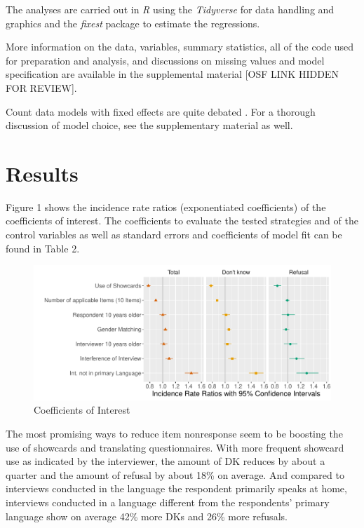 \documentclass[a4paper,12pt]{article}
\begin{document}
The analyses are carried out in \textit{R} \citep{rcoreteamLanguageEnvironmentStatistical2023} using the \textit{Tidyverse} \citep{wickhamWelcomeTidyverse2019} for data handling and graphics and the \textit{fixest} package \citep{bergeEfficientEstimationMaximum2018} to estimate the regressions.

More information on the data, variables, summary statistics, all of the code used for preparation and analysis, and discussions on missing values and model specification are available in the  %
{supplemental material} [OSF LINK HIDDEN FOR REVIEW].

Count data models with fixed effects are quite debated \citep{wooldridgeDistributionfreeEstimationNonlinear1999, allisonFixedEffectsNegativeBinomial2002, cameronRegressionAnalysisCount2013}. For a thorough discussion of model choice, see the supplementary material as well.

\section{Results}

Figure 1 shows the incidence rate ratios (exponentiated coefficients) of the coefficients of interest. The coefficients to evaluate the tested strategies and of the control variables as well as standard errors and coefficients of model fit can be found in Table 2.

\begin{figure}
\centering
\caption{Coefficients of Interest}
\includegraphics[width=\linewidth]{results_inr_ess9.pdf}
\end{figure}

{\small

}

The most promising ways to reduce item nonresponse seem to be boosting the use of showcards and translating questionnaires. With more frequent showcard use as indicated by the interviewer, the amount of DK reduces by about a quarter and the amount of refusal by about 18\% on average. And compared to interviews conducted in the language the respondent primarily speaks at home, interviews conducted in a language different from the respondents' primary language show on average 42\% more DKs and 26\% more refusals.
\end{document}

